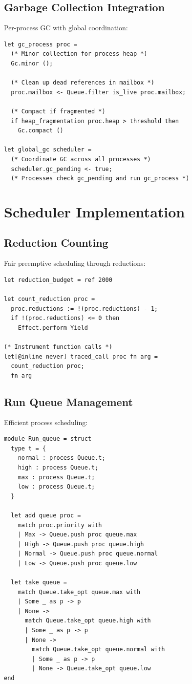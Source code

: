 \documentclass[12pt,a4paper]{report}
\begin{document}
\subsection{Garbage Collection Integration}

Per-process GC with global coordination:

\begin{lstlisting}
let gc_process proc =
  (* Minor collection for process heap *)
  Gc.minor ();
  
  (* Clean up dead references in mailbox *)
  proc.mailbox <- Queue.filter is_live proc.mailbox;
  
  (* Compact if fragmented *)
  if heap_fragmentation proc.heap > threshold then
    Gc.compact ()

let global_gc scheduler =
  (* Coordinate GC across all processes *)
  scheduler.gc_pending <- true;
  (* Processes check gc_pending and run gc_process *)
\end{lstlisting}

\section{Scheduler Implementation}

\subsection{Reduction Counting}

Fair preemptive scheduling through reductions:

\begin{lstlisting}
let reduction_budget = ref 2000

let count_reduction proc =
  proc.reductions := !(proc.reductions) - 1;
  if !(proc.reductions) <= 0 then
    Effect.perform Yield

(* Instrument function calls *)
let[@inline never] traced_call proc fn arg =
  count_reduction proc;
  fn arg
\end{lstlisting}

\subsection{Run Queue Management}

Efficient process scheduling:

\begin{lstlisting}
module Run_queue = struct
  type t = {
    normal : process Queue.t;
    high : process Queue.t;
    max : process Queue.t;
    low : process Queue.t;
  }

  let add queue proc =
    match proc.priority with
    | Max -> Queue.push proc queue.max
    | High -> Queue.push proc queue.high
    | Normal -> Queue.push proc queue.normal
    | Low -> Queue.push proc queue.low

  let take queue =
    match Queue.take_opt queue.max with
    | Some _ as p -> p
    | None ->
      match Queue.take_opt queue.high with
      | Some _ as p -> p
      | None ->
        match Queue.take_opt queue.normal with
        | Some _ as p -> p
        | None -> Queue.take_opt queue.low
end
\end{lstlisting}
\end{document}
